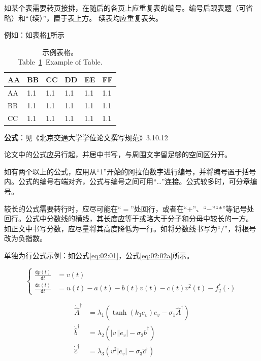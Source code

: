 如某个表需要转页接排，在随后的各页上应重复表的编号。编号后跟表题（可省略）和“（续）”，置于表上方。
续表均应重复表头。

例如：如表格\ref{table:02:01}所示

\begin{table}[!htb]\small   %
  \centering
  \renewcommand\arraystretch{1}
  \caption{示例表格。\\Table~\ref{table:02:01}~Example of Table.}

 \begin{tabular}{p{1cm} p{1cm}<{\centering} p{1cm}<{\centering} p{1cm}<{\centering} p{1cm}<{\centering} p{1cm}<{\centering}  }
  \hline
  \textbf{AA} &
  \textbf{BB} &
  \textbf{CC} &
  \textbf{DD} &
  \textbf{EE} &
  \textbf{FF}
  \\
  \hline
    AA   &  1.1   & 1.1 & 1.1 & 1.1&  1.1    \\
    BB   &  1.1   & 1.1 & 1.1 & 1.1&  1.1    \\
    CC   &  1.1   & 1.1 & 1.1 & 1.1&  1.1   \\
  \hline
  \end{tabular}
  \label{table:02:01}
\end{table}


\textbf{公式}：见《北京交通大学学位论文撰写规范》3.10.12

论文中的公式应另行起，并居中书写，与周围文字留足够的空间区分开。

如有两个以上的公式，应用从“1”开始的阿拉伯数字进行编号，并将编号置于括号内。公式的编号右端对齐，公式与编号之间可用“…”连接。公式较多时，可分章编号。

较长的公式需要转行时，应尽可能在“$ = $”处回行，或者在“$ + $”、“$-$”“$*$”等记号处回行。公式中分数线的横线，其长度应等于或略大于分子和分母中较长的一方。
如正文中书写分数，应尽量将其高度降低为一行。如将分数线书写为“$/$”，将根号改为负指数。


单独为行公式示例：如公式\ref{eq:02:01}，公式\ref{eq:02:02a}所示。

\begin{equation}\label{eq:02:01}
\left\{
\begin{split}
\frac{\texttt{d}p(t)}{\texttt{d}t}&=v(t)\\
\frac{\texttt{d}v(t)}{\texttt{d}t}&=u(t)-a(t)-b(t)v(t)-c(t)v^2(t)-f_2^*(\cdot)
\end{split}
\right.
\end{equation}


\begin{subequations}\label{eq:02:02}
  \begin{align}
  \dot{\hat{A}}^\dag&=\lambda_1\left(\tanh(k_3e_v)e_v-\sigma_1\hat{A}^\dag\right)\label{eq:02:02a}\\
  \dot{\hat{b}}^\dag&=\lambda_2\left(|v||e_v|-\sigma_2\hat{b}^\dag\right)\label{eq:02:02b}\\
  \dot{\hat{c}}^\dag&=\lambda_3\left(v^2|e_v|-\sigma_3\hat{c}^\dag\right)\label{eq:02:02c}
  \end{align}
  \end{subequations}

